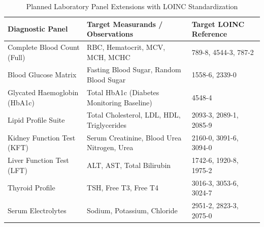 \documentclass[12pt, a4paper]{report}
\numberwithin{equation}{chapter}
\begin{document}
\begin{table}[htbp]
\centering
\caption{Planned Laboratory Panel Extensions with LOINC Standardization}
\label{tab:loinc_expansion}

\begin{tabularx}{\textwidth}{|l|X|l|}
\hline
\textbf{Diagnostic Panel} & \textbf{Target Measurands / Observations} & \textbf{Target LOINC Reference} \\ \hline
Complete Blood Count (Full) & RBC, Hematocrit, MCV, MCH, MCHC & 789-8, 4544-3, 787-2 \\ \hline
Blood Glucose Matrix & Fasting Blood Sugar, Random Blood Sugar & 1558-6, 2339-0 \\ \hline
Glycated Haemoglobin (HbA1c) & Total HbA1c (Diabetes Monitoring Baseline) & 4548-4 \\ \hline
Lipid Profile Suite & Total Cholesterol, LDL, HDL, Triglycerides & 2093-3, 2089-1, 2085-9 \\ \hline
Kidney Function Test (KFT) & Serum Creatinine, Blood Urea Nitrogen, Urea & 2160-0, 3091-6, 3094-0 \\ \hline
Liver Function Test (LFT) & ALT, AST, Total Bilirubin & 1742-6, 1920-8, 1975-2 \\ \hline
Thyroid Profile & TSH, Free T3, Free T4 & 3016-3, 3053-6, 3024-7 \\ \hline
Serum Electrolytes & Sodium, Potassium, Chloride & 2951-2, 2823-3, 2075-0 \\ \hline
\end{tabularx}

\end{table}
\clearpage
\end{document}
